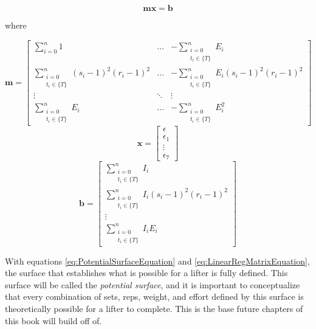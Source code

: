 \begin{equation*}
    \label{eq:LinearRegMatrixEquation}
	\mathbf{mx=b}
\end{equation*}
\centerline{where}
\begin{equation*}
    \mathbf{m}=\left[
    \begin{matrix}
        \sum_{i=0}^n 1 &
        \dots &
        -\sum_{\substack{i=0\\ t_i\in \{ T \}}}^n E_i \\

        \sum_{\substack{i=0\\ t_i\in \{ T \}}}^n (s_i-1)^2(r_i-1)^2 &
        \dots &
        -\sum_{\substack{i=0\\ t_i\in \{ T \}}}^n E_i (s_i-1)^2(r_i-1)^2\\

        \vdots &
        \ddots &
        \vdots \\
        
        \sum_{\substack{i=0\\ t_i\in \{ T \}}}^n E_i &
        \dots &
        -\sum_{\substack{i=0\\ t_i\in \{ T \}}}^n E_i^2
    \end{matrix}
    \right]
\end{equation*}
\begin{equation*}
    \mathbf{x}=\left[
    \begin{matrix}
        \epsilon \\ \epsilon_1 \\ \vdots \\ \epsilon_7
    \end{matrix}
    \right]
\end{equation*}
\begin{equation*}
    \mathbf{b}=\left[
    \begin{matrix}
        \sum_{\substack{i=0\\ t_i\in \{ T \}}}^n I_i \\
        \sum_{\substack{i=0\\ t_i\in \{ T \}}}^n I_i(s_i-1)^2(r_i-1)^2 \\
        \vdots \\
        \sum_{\substack{i=0\\ t_i\in \{ T \}}}^n I_i E_i
    \end{matrix}
    \right]
\end{equation*}

With equations \ref{eq:PotentialSurfaceEquation} and \ref{eq:LinearRegMatrixEquation}, the surface that establishes what is possible for a lifter is fully defined. This surface will be called the \textit{potential surface}, and it is important to conceptualize that every combination of sets, reps, weight, and effort defined by this surface is theoretically possible for a lifter to complete. This is the base future chapters of this book will build off of.

